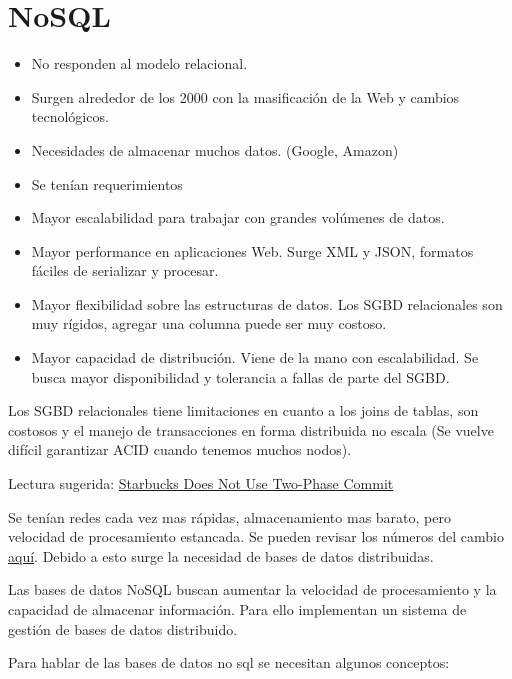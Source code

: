\section{NoSQL}

\begin{itemize}
\item No responden al modelo relacional.
\item Surgen alrededor de los 2000 con la masificación de la Web y cambios tecnológicos.
\item Necesidades de almacenar muchos datos. (Google, Amazon)
\item Se tenían requerimientos
\item Mayor escalabilidad para trabajar con grandes volúmenes de datos.
\item Mayor performance en aplicaciones Web. Surge XML y JSON, formatos fáciles de serializar y procesar.
\item Mayor flexibilidad sobre las estructuras de datos. Los SGBD relacionales son muy rígidos, agregar una columna puede ser muy costoso.
\item Mayor capacidad de distribución. Viene de la mano con escalabilidad. Se busca mayor disponibilidad y tolerancia a fallas de parte del SGBD.
\end{itemize}

\medskip
Los SGBD relacionales tiene limitaciones en cuanto a los joins de tablas, son costosos y el manejo de transacciones en forma distribuida no escala (Se vuelve difícil garantizar ACID cuando tenemos muchos nodos).

\medskip
Lectura sugerida: \href{https://www.enterpriseintegrationpatterns.com/ramblings/18_starbucks.html}{Starbucks Does Not Use Two-Phase Commit}

\medskip

Se tenían redes cada vez mas rápidas, almacenamiento mas barato, pero velocidad de procesamiento estancada. Se pueden revisar los números del cambio \href{https://colin-scott.github.io/personal_website/research/interactive_latency.html}{aquí}. Debido a esto surge la necesidad de bases de datos distribuidas.

\medskip
Las bases de datos NoSQL buscan aumentar la velocidad de procesamiento y la capacidad de almacenar información. Para ello implementan un sistema de gestión de bases de datos distribuido.

\bigskip
Para hablar de las bases de datos no sql se necesitan algunos conceptos:


